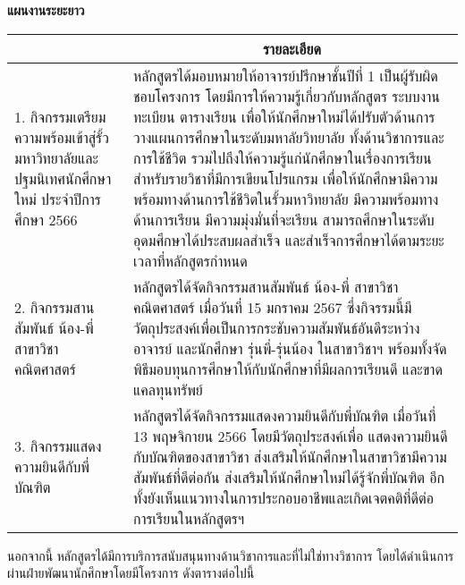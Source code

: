 \noindent
\textbf{แผนงานระยะยาว}
\begin{longtable}{ |>{\raggedright}p{3cm}|p{10.5cm}|} 
\hline
\centering{\textbf{กิจกรรม}}   & \multicolumn{1}{c|}{\textbf{รายละเอียด}} \\ \hline
1. กิจกรรมเตรียมความพร้อมเข้าสู่รั้วมหาวิทยาลัยและปฐมนิเทศนักศึกษาใหม่ ประจำปีการศึกษา 2566   
& หลักสูตรได้มอบหมายให้อาจารย์ปรึกษาชั้นปีที่ 1 เป็นผู้รับผิดชอบโครงการ โดยมีการให้ความรู้เกี่ยวกับหลักสูตร ระบบงานทะเบียน ตารางเรียน     
เพื่อให้นักศึกษาใหม่ได้ปรับตัวด้านการวางแผนการศึกษาในระดับมหาลัยวิทยาลัย ทั้งด้านวิชาการและการใช้ชีวิต รวมไปถึงให้ความรู้แก่นักศึกษาในเรื่องการเรียนสำหรับรายวิชาที่มีการเขียนโปรแกรม เพื่อให้นักศึกษามีความพร้อมทางด้านการใช้ชีวิตในรั้วมหาวิทยาลัย มีความพร้อมทางด้านการเรียน มีความมุ่งมั่นที่จะเรียน สามารถศึกษาในระดับอุดมศึกษาได้ประสบผลสำเร็จ และสำเร็จการศึกษาได้ตามระยะเวลาที่หลักสูตรกำหนด
\\ 
\hline
2. กิจกรรมสานสัมพันธ์ น้อง-พี่ สาขาวิชาคณิตศาสตร์   
&   หลักสูตรได้จัดกิจกรรมสานสัมพันธ์ น้อง-พี่ สาขาวิชาคณิตศาสตร์ เมื่อวันที่ 15 มกราคม 2567 ซึ่งกิจรรมนี้มีวัตถุประสงค์เพื่อเป็นการกระชับความสัมพันธ์อันดีระหว่างอาจารย์ และนักศึกษา รุ่นพี่-รุ่นน้อง ในสาขาวิชาฯ พร้อมทั้งจัดพิธีมอบทุนการศึกษาให้กับนักศึกษาที่มีผลการเรียนดี และขาดแคลทุนทรัพย์
   \\ 
\hline
3. กิจกรรมแสดงความยินดีกับพี่บัณฑิต  
& หลักสูตรได้จัดกิจกรรมแสดงความยินดีกับพี่บัณฑิต เมื่อวันที่ 13 พฤษจิกายน 2566 โดยมีวัตถุประสงค์เพื่อ แสดงความยินดีกับบัณฑิตของสาขาวิชา ส่งเสริมให้นักศึกษาในสาขาวิชามีความสัมพันธ์ที่ดีต่อกัน ส่งเสริมให้นักศึกษาใหม่ได้รู้จักพี่บัณฑิต อีกทั้งยังเห็นแนวทางในการประกอบอาชีพและเกิดเจตคติที่ดีต่อการเรียนในหลักสูตรฯ
   \\ 
\hline
\end{longtable}


นอกจากนี้ หลักสูตรได้มีการบริการสนับสนุนทางด้านวิชาการและที่ไม่ใช่ทางวิชาการ โดยได้ดำเนินการผ่านฝ่ายพัฒนานักศึกษาโดยมีโครงการ ดังตารางต่อไปนี้

